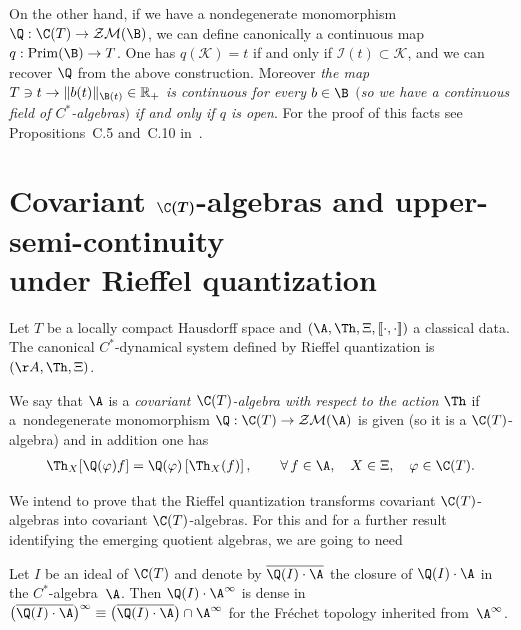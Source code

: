 On the other hand, if we have a nondegenerate monomorphism $\Q:\C(T)\to \mathcal Z\mathcal M(\B)$, we can def\/ine canonically
a continuous map $q:{\rm Prim}(\B)\to T$. One has $q(\mathcal K)=t$ if and only if $\mathcal I(t)\subset \mathcal K$,
and we can recover $\Q$ from the above construction.
Moreover {\it the map $T\ni t\to\| b(t)\|_{\B(t)}\in\mathbb R_+$ is continuous
for every $b\in\B$ $($so we have a continuous field of $C^*$-algebras$)$ if and only if $q$ is open}.
For the proof of this facts see Propositions~C.5 and~C.10 in~\cite{Wi}.



\section[Covariant $\C(T)$-algebras and upper-semi-continuity under Rieffel quantization]{Covariant $\boldsymbol{\C(T)}$-algebras and upper-semi-continuity\\ under Rief\/fel quantization}\label{isra}


Let $T$ be a locally compact Hausdorf\/f space and $(\A,\Th,\Xi,[\![\cdot,\cdot]\!])$ a classical data.
The canonical $C^*$-dynamical system def\/ined by Rief\/fel quantization is $(\AA,\Th,\Xi)$.

\begin{Definition}\label{cedete+}
We say that $\A$ is a {\it covariant $\C(T)$-algebra with respect to the action} $\Th$
if a~nondegenerate monomorphism $\Q:\C(T)\rightarrow\mathcal Z\mathcal M(\A)$ is given
(so it is a $\C(T)$-algebra) and in addition one has
\begin{gather}\label{incep}
\Th_X[\Q(\varphi)f]=\Q(\varphi)\left[\Th_X(f)\right],\qquad \forall\,f\in\A,\quad X\in\Xi,\quad \varphi\in\C(T) .
\end{gather}
\end{Definition}

We intend to prove that the Rief\/fel quantization transforms covariant $\C(T)$-algebras into covariant $\C(T)$-algebras.
For this and for a further result identifying the emerging quotient algebras, we are going to need

\begin{Lemma}\label{densly}
Let $I$ be an ideal of $\C(T)$ and denote by $\overline{\Q(I)\cdot\A}$ the closure of $\Q(I)\cdot\A$ in the $C^*$-algebra~$\A$.
Then $\Q(I)\cdot\A^\infty$ is dense in
$\big(\overline{\Q(I)\cdot\A}\big)^\infty\equiv\big(\overline{\Q(I)\cdot\A}\big)\cap\A^\infty$
for the Fr\'echet topology inherited from~$\A^\infty$.
\end{Lemma}

